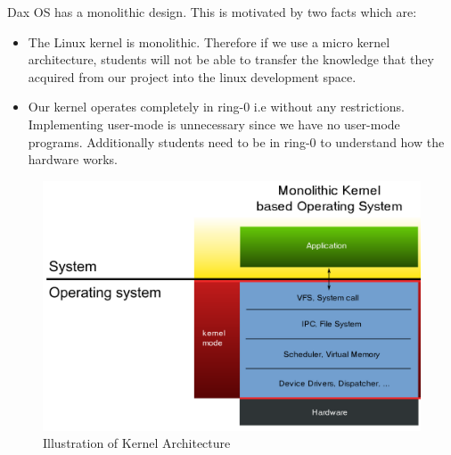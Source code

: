 \begin{flushleft}
	Dax OS has a monolithic design. This is motivated by two facts which are:
	\begin{itemize}
		\item The Linux kernel is monolithic. Therefore if we use a micro kernel architecture, students will not be
		able to transfer the knowledge that they acquired from our project into the linux development space.
		
		\item Our kernel operates completely in ring-0 i.e without any restrictions. Implementing user-mode
		is unnecessary since we have no user-mode programs. Additionally students need to be in ring-0
		to understand how the hardware works.
		
	\end{itemize}
	
\end{flushleft}
\begin{figure}[h!]
	\includegraphics[width=\textwidth,height=\textheight,keepaspectratio]{kernel_arch}
	\caption{Illustration of Kernel Architecture}
\end{figure}
\pagebreak

